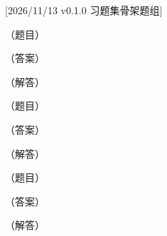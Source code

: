 %
[2026/11/13 v0.1.0 习题集骨架题组]
\begin{exercise}[title={基础题},level=basic,points=8]
（题目）
\begin{answer}（答案）\end{answer}
\begin{solution}（解答）\end{solution}
\end{exercise}
\begin{exercise}[title={常规题},level=standard,points=12]
（题目）
\begin{answer}（答案）\end{answer}
\begin{solution}（解答）\end{solution}
\end{exercise}
\begin{exercise}[title={提高题},level=advanced,points=15]
（题目）
\begin{answer}（答案）\end{answer}
\begin{solution}（解答）\end{solution}
\end{exercise}

